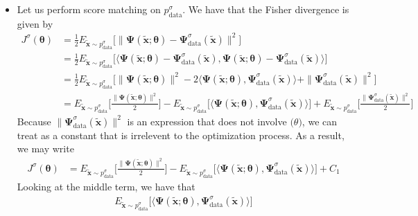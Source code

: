 \documentclass[10pt]{article}
\newcommand{\ve}[1]{\mathbf{#1}}
\newcommand{\mrm}[1]{\mathrm{#1}}
\newcommand{\ves}[1]{\boldsymbol{#1}}
\begin{document}
\begin{itemize}
  \item Let us perform score matching on $p^\sigma_{\mrm{data}}$. We have that the Fisher divergence is given by
  \begin{align*}
    J^\sigma(\ves{\theta}) 
    &= \frac{1}{2} E_{\widetilde{\ve{x}} \sim p^\sigma_{\mrm{data}}} \Big[ \big\| \ves{\Psi}(\widetilde{\ve{x}};\ves{\theta}) - \ves{\Psi}^\sigma_{\mrm{data}}(\widetilde{\ve{x}}) \big\|^2 \Big] \\    
    &= \frac{1}{2} E_{\widetilde{\ve{x}} \sim p^\sigma_{\mrm{data}}} \Big[ \big\langle \ves{\Psi}(\widetilde{\ve{x}};\ves{\theta}) - \ves{\Psi}^\sigma_{\mrm{data}}(\widetilde{\ve{x}}), \ves{\Psi}(\widetilde{\ve{x}};\ves{\theta}) - \ves{\Psi}^\sigma_{\mrm{data}}(\widetilde{\ve{x}}) \big\rangle \Big] \\
    &= \frac{1}{2} E_{\widetilde{\ve{x}} \sim p^\sigma_{\mrm{data}}}  \Big[ \| \ves{\Psi}(\widetilde{\ve{x}};\ves{\theta}) \|^2 - 2 \big\langle \ves{\Psi}(\widetilde{\ve{x}};\ves{\theta}), \ves{\Psi}^\sigma_{\mrm{data}}(\widetilde{\ve{x}}) 
    \big\rangle + \| \ves{\Psi}^\sigma_{\mrm{data}}(\widetilde{\ve{x}}) \|^2 \Big] \\
    &= E_{\widetilde{\ve{x}} \sim p^\sigma_{\mrm{data}}}\bigg[ \frac{\| \ves{\Psi}(\widetilde{\ve{x}};\ves{\theta}) \|^2}{2} \bigg]
    - E_{\widetilde{\ve{x}} \sim p^\sigma_{\mrm{data}}}\Big[ \big\langle \ves{\Psi}(\widetilde{\ve{x}};\ves{\theta}), \ves{\Psi}^\sigma_{\mrm{data}}(\widetilde{\ve{x}}) 
    \big\rangle  \Big]
    + E_{\widetilde{\ve{x}} \sim p^\sigma_{\mrm{data}}}\bigg[ \frac{\| \ves{\Psi}^\sigma_{\mrm{data}}(\widetilde{\ve{x}}) \|^2}{2} \bigg]
  \end{align*}
  Because $\| \ves{\Psi}^\sigma_{\mrm{data}}(\widetilde{\ve{x}}) \|^2$ is an expression that does not involve $\ves(\theta)$, we can treat as a constant that is irrelevent to the optimization process. As a result, we may write
  \begin{align*}
    J^\sigma(\ves{\theta}) 
    &= E_{\widetilde{\ve{x}} \sim p^\sigma_{\mrm{data}}}\bigg[ \frac{\| \ves{\Psi}(\widetilde{\ve{x}};\ves{\theta}) \|^2}{2} \bigg]
    - E_{\widetilde{\ve{x}} \sim p^\sigma_{\mrm{data}}}\Big[ \big\langle \ves{\Psi}(\widetilde{\ve{x}};\ves{\theta}), \ves{\Psi}^\sigma_{\mrm{data}}(\widetilde{\ve{x}}) 
    \big\rangle  \Big] 
    + C_1
  \end{align*}
  Looking at the middle term, we have that
  \begin{align*}
    E_{\widetilde{\ve{x}} \sim p^\sigma_{\mrm{data}}}\Big[ \big\langle \ves{\Psi}(\widetilde{\ve{x}};\ves{\theta}), \ves{\Psi}^\sigma_{\mrm{data}}(\widetilde{\ve{x}}) \big\rangle \Big]

\end{align*}
\end{itemize}
\end{document}
